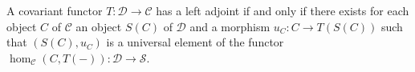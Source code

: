 A covariant functor $T : \mathcal{D} \to \mathcal{C}$ has a left adjoint if and only if there exists for each object $C$ of $\mathcal{C}$ an object $S(C)$ of $\mathcal{D}$ and a morphism $u_C : C \to T(S(C))$ such that $(S(C), u_C)$ is a universal element of the functor $\hom_{\mathcal{C}}(C, T(-)) : \mathcal{D} \to \mathcal{S}$.
